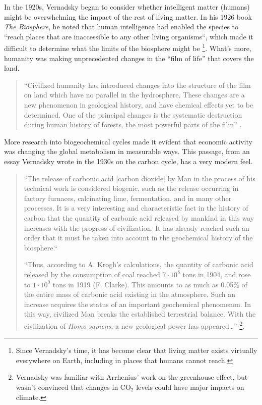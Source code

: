 \documentclass[11pt,a4paper]{article}
\begin{document}
In the 1920s, Vernadsky began to consider whether intelligent matter (humans)
might be overwhelming the impact of the rest of living matter. In his 1926
book \emph{The Biosphere}, he noted that human intelligence had enabled the
species to “reach places that are inaccessible to any other living organisms“,
which made it difficult to determine what the limits of the biosphere might be
\cite[p. 142]{6}\footnote{Since Vernadsky’s time, it has become clear that
  living matter exists virtually everywhere on Earth, including in places that
  humans cannot reach.}. What’s more, humanity was making unprecedented
changes in the “film of life” that covers the land.
\begin{quote}
  “Civilized humanity has introduced changes into the structure of the film on
  land which have no parallel in the hydrosphere. These changes are a new
  phenomenon in geological history, and have chemical effects yet to be
  determined. One of the principal changes is the systematic destruction
  during human history of forests, the most powerful parts of the film”
  \cite[p. 143]{6}.
\end{quote}
More research into biogeochemical cycles made it evident that economic
activity was changing the global metabolism in measurable ways. This passage,
from an essay Vernadsky wrote in the 1930s on the carbon cycle, has a very
modern feel.
\begin{quote}  
  “The release of carbonic acid [carbon dioxide] by Man in the process of his
  technical work is considered biogenic, such as the release occurring in
  factory furnaces, calcinating lime, fermentation, and in many other
  processes.  It is a very interesting and characteristic fact in the history
  of carbon that the quantity of carbonic acid released by mankind in this way
  increases with the progress of civilization. It has already reached such an
  order that it must be taken into account in the geochemical history of the
  biosphere.“

  “Thus, according to A. Krogh’s calculations, the quantity of carbonic acid
  released by the consumption of coal reached $7\cdot 10^8$ tons in 1904, and
  rose to $1\cdot 10^9$ tons in 1919 (F. Clarke). This amounts to as much as
  0.05\% of the entire mass of carbonic acid existing in the atmosphere. Such
  an increase acquires the status of an important geochemical phenomenon. In
  this way, civilized Man breaks the established terrestrial balance. With the
  civilization of \emph{Homo sapiens}, a new geological power has appeared…”
  \cite[p. 185-186]{11}\footnote{Vernadsky was familiar with Arrhenius’ work
    on the greenhouse effect, but wasn’t convinced that changes in CO$_2$
    levels could have major impacts on climate.}.
\end{quote}
\end{document}
